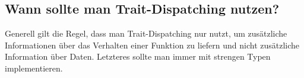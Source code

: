 \documentclass{article}
\begin{document}
\subsection*{Wann sollte man Trait-Dispatching nutzen?}
Generell gilt die Regel, dass man Trait-Dispatching nur nutzt, um zusätzliche Informationen über das Verhalten einer Funktion zu liefern und nicht zusätzliche Information über Daten. Letzteres sollte man immer mit strengen Typen implementieren.
\end{document}

